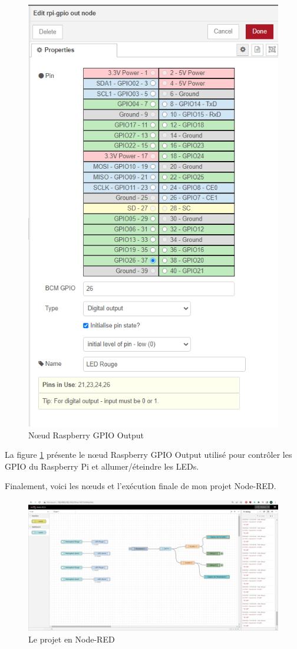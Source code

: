 \begin{figure}[H]
\centering
\includegraphics[width=12cm]{Images/Node-7.png}
\caption{Nœud Raspberry GPIO Output}
\label{Chap4.3.19}
\end{figure}

La figure \ref{Chap4.3.19} présente le nœud Raspberry GPIO Output utilisé pour contrôler les GPIO du Raspberry Pi et allumer/éteindre les LEDs.

Finalement, voici les nœuds et l'exécution finale de mon projet Node-RED.

\begin{figure}[H]
\centering
\includegraphics[width=15cm]{Images/Node-1.png}
\caption{Le projet en Node-RED}
\label{Chap4.3.20}
\end{figure}

